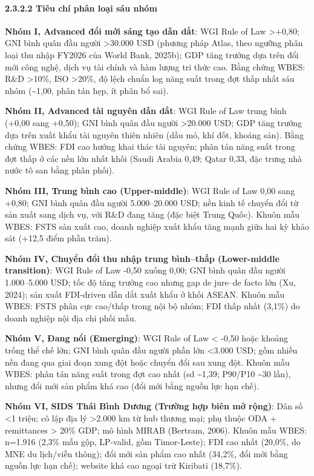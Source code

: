 \documentclass[
  a4paper,
  13pt]{extreport}
\begin{document}
\hypertarget{tiuxeau-chuxed-phuxe2n-loux1ea1i-suxe1u-nhuxf3m}{%
\paragraph{2.3.2.2 Tiêu chí phân loại sáu
nhóm}\label{tiuxeau-chuxed-phuxe2n-loux1ea1i-suxe1u-nhuxf3m}}

\textbf{Nhóm I, Advanced đổi mới sáng tạo dẫn dắt}: WGI Rule of Law
\textgreater+0,80; GNI bình quân đầu người \textgreater30.000 USD
(phương pháp Atlas, theo ngưỡng phân loại thu nhập FY2026 của World
Bank, 2025b); GDP tăng trưởng dựa trên đổi mới công nghệ, dịch vụ tài
chính và hàm lượng tri thức cao. Bằng chứng WBES: R\&D \textgreater10\%,
ISO \textgreater20\%, độ lệch chuẩn log năng suất trong đợt thấp nhất
sáu nhóm (\textasciitilde1,00, phân tán hẹp, ít phân bổ sai).

\textbf{Nhóm II, Advanced tài nguyên dẫn dắt}: WGI Rule of Law trung
bình (+0,00 sang +0,50); GNI bình quân đầu người \textgreater20.000 USD;
GDP tăng trưởng dựa trên xuất khẩu tài nguyên thiên nhiên (dầu mỏ, khí
đốt, khoáng sản). Bằng chứng WBES: FDI cao hướng khai thác tài nguyên;
phân tán năng suất trong đợt thấp ở các nền lớn nhất khối (Saudi Arabia
0,49; Qatar 0,33, đặc trưng nhà nước tô san bằng phân phối).

\textbf{Nhóm III, Trung bình cao (Upper-middle)}: WGI Rule of Law 0,00
sang +0,80; GNI bình quân đầu người 5.000--20.000 USD; nền kinh tế
chuyển đổi từ sản xuất sang dịch vụ, với R\&D đang tăng (đặc biệt Trung
Quốc). Khuôn mẫu WBES: FSTS sản xuất cao, doanh nghiệp xuất khẩu tăng
mạnh giữa hai kỳ khảo sát (+12,5 điểm phần trăm).

\textbf{Nhóm IV, Chuyển đổi thu nhập trung bình--thấp (Lower-middle
transition)}: WGI Rule of Law -0,50 xuống 0,00; GNI bình quân đầu người
1.000--5.000 USD; tốc độ tăng trưởng cao nhưng gap de jure--de facto lớn
(Xu, 2024); sản xuất FDI-driven dẫn dắt xuất khẩu ở khối ASEAN. Khuôn
mẫu WBES: FSTS phân cực cao/thấp trong nội bộ nhóm; FDI thấp nhất
(3,1\%) do doanh nghiệp nội địa chi phối mẫu.

\textbf{Nhóm V, Đang nổi (Emerging)}: WGI Rule of Law \textless{} -0,50
hoặc khoảng trống thể chế lớn; GNI bình quân đầu người phần lớn
\textless3.000 USD; gồm nhiều nền đang qua giai đoạn xung đột hoặc
chuyển đổi sau xung đột. Khuôn mẫu WBES: phân tán năng suất trong đợt
cao nhất (sd \textasciitilde1,39; P90/P10 \textasciitilde30 lần), nhưng
đổi mới sản phẩm khá cao (đổi mới bằng nguồn lực hạn chế).

\textbf{Nhóm VI, SIDS Thái Bình Dương (Trường hợp biên mở rộng)}: Dân số
\textless1 triệu; cô lập địa lý \textgreater2.000 km từ hub thương mại;
phụ thuộc ODA + remittances \textgreater{} 20\% GDP; mô hình MIRAB
(Bertram, 2006). Khuôn mẫu WBES: n=1.916 (2,3\% mẫu gộp, LP-valid, gồm
Timor-Leste); FDI cao nhất (20,0\%, do MNE du lịch/viễn thông); đổi mới
sản phẩm cao nhất (34,2\%, đổi mới bằng nguồn lực hạn chế); website khá
cao ngoại trừ Kiribati (18,7\%).
\end{document}
